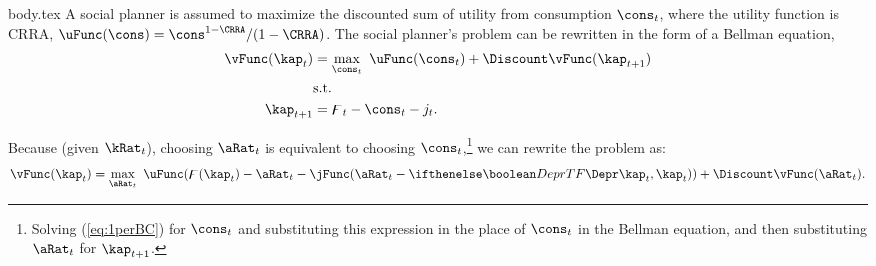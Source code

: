 \documentclass{handout}
\begin{document}
\begin{verbatimwrite}{body.tex}
A social planner is assumed to maximize the discounted sum of
utility from consumption $\cons_{t}$, where the utility function is CRRA, $\uFunc(\cons )=\cons^{1-\CRRA}/(1-\CRRA)$.
The social planner's problem can be rewritten in the form of a Bellman equation,
\begin{equation}\begin{gathered}\begin{aligned}
\vFunc(\kap_t) &= %
\max_{\cons_t} ~\uFunc(\cons_t)+\Discount \vFunc(\kap_{t+1})
\\ & \text{s.t.}  \notag
\\ \kap_{t+1} & =  \digamma_t-\cons_t-j_t.
\end{aligned}\end{gathered}\end{equation}

Because (given $\kRat_{t}$), choosing $\aRat_t$ is equivalent to choosing $\cons_t$,\footnote{Solving
  (\ref{eq:1perBC}) for $\cons_t$ and substituting this expression in
  the place of $\cons_t$ in the Bellman equation, and then
  substituting $\aRat_t$ for $\kap_{t+1}$.} we can rewrite
the problem as:
\begin{equation}
\vFunc(\kap_{t})=\max_{\aRat_{t}}
~\uFunc(\digamma(\kap_{t})-\aRat_{t}-\jFunc(\aRat_{t}-\ifDepr{\Depr}{}\kap_{t},\kap_{t}))+\Discount
\vFunc(\aRat_{t})\label{eq:aEnd}.
\end{equation}


\end{verbatimwrite}
\end{document}
